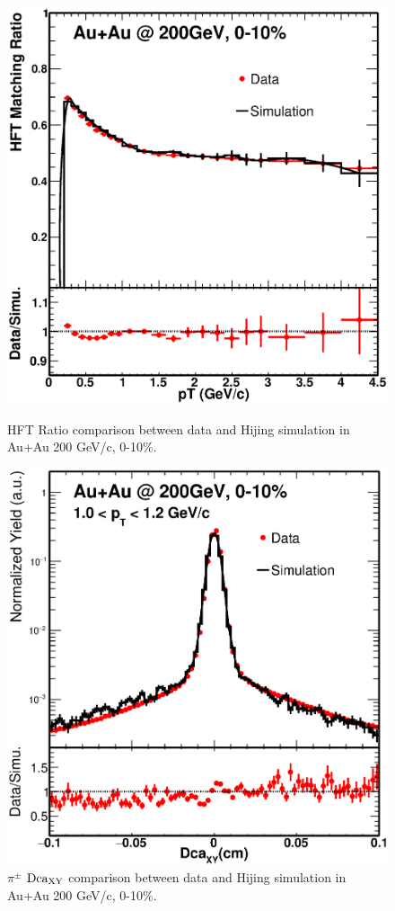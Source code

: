 \begin{figure}[htbp]
\begin{minipage}[htbp]{0.52\linewidth}
\centering
\includegraphics[width=1.0\textwidth,angle=0]{figure/Run14_D0HFT/HijingRatio.eps}
\caption{ HFT Ratio comparison between data and Hijing simulation in Au+Au 200 GeV/c, 0-10\%.\label{HijingRatio}}
\end{minipage}
\hfill
\begin{minipage}[htbp]{0.52\linewidth}
\centering
\includegraphics[width=1.0\textwidth,angle=0]{figure/Run14_D0HFT/HijingDca.eps} 
\caption{ $\pi^{\pm}$ $\textup{Dca}_{\textup{XY}}$ comparison between data and Hijing simulation in Au+Au 200 GeV/c, 0-10\%.\label{HijingDca}}
\end{minipage}
\end{figure}

